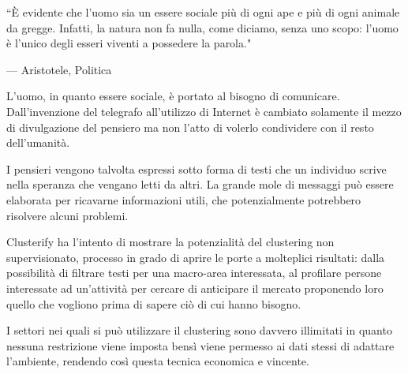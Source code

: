 
\epigraph{``È evidente che l’uomo sia un essere sociale più di ogni ape e più di ogni animale da gregge. Infatti, la natura non fa nulla, come diciamo, senza uno scopo: l’uomo è l’unico degli esseri viventi a possedere la parola."}{--- \textup{Aristotele}, Politica }

L'uomo, in quanto essere sociale, è portato al bisogno di comunicare. Dall'invenzione del telegrafo all'utilizzo di Internet è cambiato solamente il mezzo di divulgazione del pensiero ma non l'atto di volerlo condividere con il resto dell'umanità.

I pensieri vengono talvolta espressi sotto forma di testi che un individuo scrive nella speranza che vengano letti da altri. La grande mole di messaggi può essere elaborata per ricavarne informazioni utili, che potenzialmente potrebbero risolvere alcuni problemi.

Clusterify ha l'intento di mostrare la potenzialità del clustering non supervisionato, processo in grado di aprire le porte a molteplici risultati: dalla possibilità di filtrare testi per una macro-area interessata, al profilare persone interessate ad un'attività per cercare di anticipare il mercato proponendo loro quello che vogliono prima di sapere ciò di cui hanno bisogno.

 I settori nei quali si può utilizzare il clustering sono davvero illimitati in quanto nessuna restrizione viene imposta bensì viene permesso ai dati stessi di adattare l'ambiente, rendendo così questa tecnica economica e vincente.